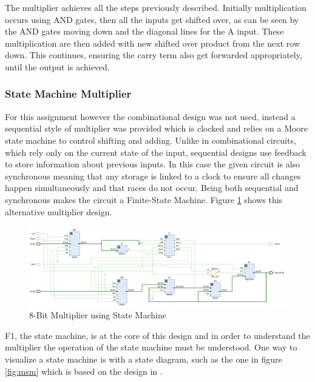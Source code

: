 \documentclass[11pt]{article}
\begin{document}
The multiplier achieves all the steps previously described.
Initially multiplication occurs using AND gates, then all the inputs get shifted over, as can be seen by the AND gates moving down and the diagonal lines for the A input.
These multiplication are then added with new shifted over product from the next row down.
This continues, ensuring the carry term also get forwarded appropriately, until the output is achieved.

\subsubsection{State Machine Multiplier}

For this assignment however the combinational design was not used, 
instead a sequential style of multiplier was provided which is clocked and relies on a Moore state machine to control shifting and adding.
Unlike in combinational circuits, which rely only on the current state of the input, sequential designs use feedback to store information about previous inputs\cite{dally}.
In this case the given circuit is also synchronous meaning that any storage is linked to a clock to ensure all changes happen simultaneously and that races do not occur.
Being both sequential and synchronous makes the circuit a Finite-State Machine\cite{dally}.
Figure \ref{fig:4bit_mult} shows this alternative multiplier design. 

\begin{figure}[H]        
    \centering
    \includegraphics[width=\textwidth]{8bit.png}
    \caption{8-Bit Multiplier using State Machine}
    \label{fig:4bit_mult}
\end{figure} 

F1, the state machine, is at the core of this design and in order to understand the multiplier the operation of the state machine must be understood.
One way to visualize a state machine is with a state diagram, such as the one in figure \ref{fig:msm} which is based on the design in \cite{smith1997application}.
\end{document}
